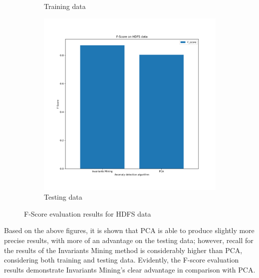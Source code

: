 \documentclass[12pt,a4paper]{article}
\begin{document}
\begin{figure}[H]
\begin{subfigure}[H]{0.45\textwidth}
			\vspace{-0.3cm}
			\caption{Training data}
		\end{subfigure}
		\hfill
		\begin{subfigure}[H]{0.45\textwidth}
			\centering
			\includegraphics[width=1.3\textwidth]{Figures/F_2_test}
			
			\vspace{-0.3cm}
			\caption{Testing data}
		\end{subfigure}
		\vspace{-0.1cm}
		\caption{F-Score evaluation results for HDFS data}
	\end{figure}

	\vspace{-0.1cm}
	\noindent Based on the above figures, it is shown that PCA is able to produce slightly more precise results, with more of an advantage on the testing data; however, recall for the results of the Invariants Mining method is considerably higher than PCA, considering both training and testing data. Evidently, the F-score evaluation results demonstrate Invariants Mining's clear advantage in comparison with PCA.
\end{document}
